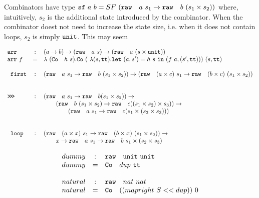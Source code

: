 Combinators have type \(\YSF{a}{b} = SF\ (\raw~a~s_1 \rightarrow \raw~b~(s_1 \times s_2))\) where,
intuitively, $s_2$ is the additional state introduced by the combinator.
When the combinator doest not need to increase the state size, i.e. when it does not contain
loops, \(s_2\) is simply \({\tt{unit}}\). This may seem 

\begin{equation*}
\begin{array}{lcl}
    \YArrow & : & (a \rightarrow b) \rightarrow (\raw\ a\ s) 
        \rightarrow (\raw\ a\ (s \times \unittype))\\
    \YArrow~f & = & \lambda~(\Co\ h\ s).
        \Co (\lambda (s,\unitval). \letin{(a,s')}{h\ s}{(f~a, (s',\unitval))})\ (s,\unitval)\\\\
    \YFirst & : & (\raw\ a\ s_1 \rightarrow \raw\ b\ (s_1 \times s_2)) \rightarrow 
                      (\raw\ (a \times c)\ s_1 \rightarrow \raw\ (b \times c)\ (s_1 \times s_2))\\
    \\\\
    \YCompose & : & (\raw\ a\ s_1 \rightarrow \raw\ b (s_1\times s_2)) \rightarrow \\
    && \qquad (\raw\ b\ (s_1 \times s_2) \rightarrow \raw\ c ((s_1\times s_2) \times s_3)) \rightarrow \\
    && \qquad\qquad (\raw\ a\ s_1 \rightarrow \raw\ c (s_1 \times (s_2 \times s_3)))\\
    \\\\
    \YLoop & : & (\raw\ (a \times x)\ s_1 \rightarrow \raw\ (b \times x)\ (s_1 \times s_2))
        \rightarrow \\
    && \qquad x \rightarrow \raw\ a\ s_1 \rightarrow \raw\ b\ s_1 \times (s_2 \times s_3) 
\end{array}
\end{equation*}

\begin{equation}
    \begin{array}{lcl}
        dummy &:& {\tt{raw}}~\ ~{\tt{unit}}\ {\tt{unit}}\\
        dummy &=& {\tt{Co}}~\ ~dup\ {\tt{tt}}\\\\
        natural &:& {\tt{raw}}~\ ~nat\ nat\\
        natural &=& {\tt{Co}}~\ ~((mapright\ S << dup))\ 0\\\\
    \end{array}
\end{equation}

